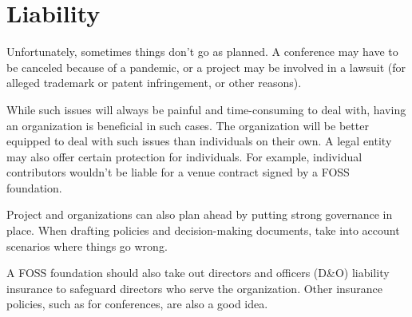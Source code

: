 


\chapter{Liability}

Unfortunately, sometimes things don't go as planned.  A conference may have to be canceled because of a pandemic, or a project may be involved in a lawsuit (for alleged trademark or patent infringement, or other reasons).

While such issues will always be painful and time-consuming to deal with, having an organization is beneficial in such cases.  The organization will be better equipped to deal with such issues than individuals on their own.  A legal entity may also offer certain protection for individuals.  For example, individual contributors wouldn't be liable for a venue contract signed by a FOSS foundation.

Project and organizations can also plan ahead by putting strong governance in place.  When drafting policies and decision-making documents, take into account scenarios where things go wrong.

A FOSS foundation should also take out directors and officers (D\&O) liability insurance to safeguard directors who serve the organization.  Other insurance policies, such as for conferences, are also a good idea.

